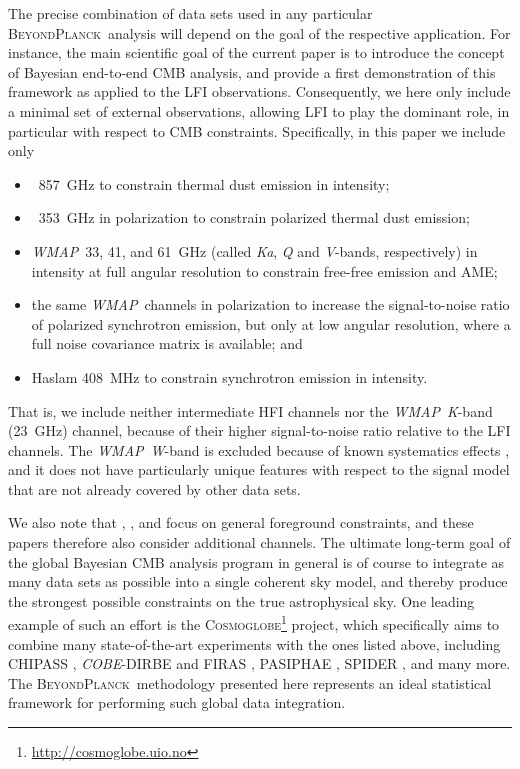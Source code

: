 \documentclass[onecolumn]{aa}
\def\WMAP{\emph{WMAP}}
\newcommand{\BP}{\textsc{BeyondPlanck}}
\begin{document}
The precise combination of data sets used in any particular
\BP\ analysis will depend on the goal of the respective
application. For instance, the main scientific goal of the current
paper is to introduce the concept of Bayesian end-to-end CMB analysis,
and provide a first demonstration of this framework as applied to the
LFI observations. Consequently, we here only include a minimal set of
external observations, allowing LFI to play the dominant role, in
particular with respect to CMB constraints. Specifically, in this
paper we include only
\begin{itemize}
\item \Planck\ 857~GHz to constrain thermal dust emission in intensity;
\item \Planck\ 353~GHz in polarization to constrain polarized thermal
  dust emission;
\item \WMAP\ 33, 41, and 61~GHz (called \emph{Ka}, \emph{Q} and \emph{V}-bands,
  respectively) in intensity at full angular resolution to constrain
  free-free emission and AME;
\item the same \WMAP\ channels in polarization to increase the signal-to-noise
  ratio of polarized synchrotron emission, but only at low angular
  resolution, where a full noise covariance matrix is available; and
\item Haslam 408~MHz \citep{haslam1982} to constrain synchrotron emission in intensity.
\end{itemize}
That is, we include neither intermediate HFI channels nor the
\WMAP\ \emph K-band (23~GHz) channel, because of their higher
signal-to-noise ratio relative to the LFI channels. The \WMAP\ \emph W-band
is excluded because of known systematics effects \citep{bennett2012},
and it does not have particularly unique features with respect to the
signal model that are not already covered by other data sets.

We also note that \citet{bp13}, \citet{bp14}, and \citet{bp15} focus
on general foreground constraints, and these papers therefore also
consider additional channels. The ultimate long-term goal of the
global Bayesian CMB analysis program in general is of course to
integrate as many data sets as possible into a single coherent sky
model, and thereby produce the strongest possible constraints on the
true astrophysical sky. One leading example of such an effort is the
\textsc{Cosmoglobe}\footnote{\href{url}{http://cosmoglobe.uio.no}}
project, which specifically aims to combine many state-of-the-art
experiments with the ones listed above, including CHIPASS
\citep{calabretta:2014}, \emph{COBE}-DIRBE \citep{hauser:1998} and
FIRAS \citep{mather:1994}, PASIPHAE \citep{tassis:2018}, SPIDER
\citep{gualtieri:2018}, and many more. The \BP\ methodology presented
here represents an ideal statistical framework for performing such
global data integration.
\end{document}
